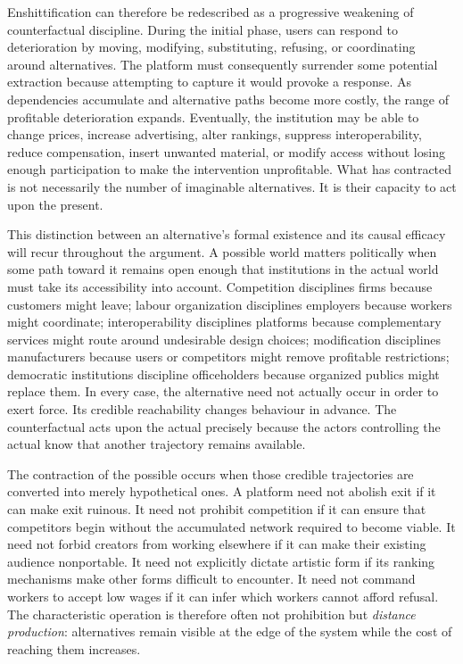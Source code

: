 \documentclass[11pt]{article}
\begin{document}
Enshittification can therefore be redescribed as a progressive weakening of counterfactual discipline. During the initial phase, users can respond to deterioration by moving, modifying, substituting, refusing, or coordinating around alternatives. The platform must consequently surrender some potential extraction because attempting to capture it would provoke a response. As dependencies accumulate and alternative paths become more costly, the range of profitable deterioration expands. Eventually, the institution may be able to change prices, increase advertising, alter rankings, suppress interoperability, reduce compensation, insert unwanted material, or modify access without losing enough participation to make the intervention unprofitable. What has contracted is not necessarily the number of imaginable alternatives. It is their capacity to act upon the present.

This distinction between an alternative's formal existence and its causal efficacy will recur throughout the argument. A possible world matters politically when some path toward it remains open enough that institutions in the actual world must take its accessibility into account. Competition disciplines firms because customers might leave; labour organization disciplines employers because workers might coordinate; interoperability disciplines platforms because complementary services might route around undesirable design choices; modification disciplines manufacturers because users or competitors might remove profitable restrictions; democratic institutions discipline officeholders because organized publics might replace them. In every case, the alternative need not actually occur in order to exert force. Its credible reachability changes behaviour in advance. The counterfactual acts upon the actual precisely because the actors controlling the actual know that another trajectory remains available.

The contraction of the possible occurs when those credible trajectories are converted into merely hypothetical ones. A platform need not abolish exit if it can make exit ruinous. It need not prohibit competition if it can ensure that competitors begin without the accumulated network required to become viable. It need not forbid creators from working elsewhere if it can make their existing audience nonportable. It need not explicitly dictate artistic form if its ranking mechanisms make other forms difficult to encounter. It need not command workers to accept low wages if it can infer which workers cannot afford refusal. The characteristic operation is therefore often not prohibition but \emph{distance production}: alternatives remain visible at the edge of the system while the cost of reaching them increases.
\end{document}
